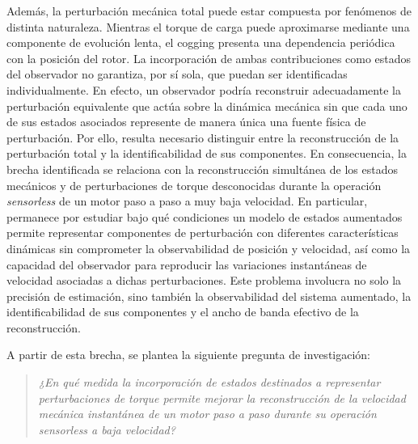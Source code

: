 Además, la perturbación mecánica total puede estar compuesta por fenómenos de distinta naturaleza. Mientras el torque de carga puede aproximarse mediante una componente de evolución lenta, el cogging presenta una dependencia periódica con la posición del rotor. La incorporación de ambas contribuciones como estados del observador no garantiza, por sí sola, que puedan ser identificadas individualmente. En efecto, un observador podría reconstruir adecuadamente la perturbación equivalente que actúa sobre la dinámica mecánica sin que cada uno de sus estados asociados represente de manera única una fuente física de perturbación. Por ello, resulta necesario distinguir entre la reconstrucción de la perturbación total y la identificabilidad de sus componentes.
%
%
%
%
%
En consecuencia, la brecha identificada se relaciona con la reconstrucción simultánea de los estados mecánicos y de perturbaciones de torque desconocidas durante la operación \textit{sensorless} de un motor paso a paso a muy baja velocidad. En particular, permanece por estudiar bajo qué condiciones un modelo de estados aumentados permite representar componentes de perturbación con diferentes características dinámicas sin comprometer la observabilidad de posición y velocidad, así como la capacidad del observador para reproducir las variaciones instantáneas de velocidad asociadas a dichas perturbaciones. Este problema involucra no solo la precisión de estimación, sino también la observabilidad del sistema aumentado, la identificabilidad de sus componentes y el ancho de banda efectivo de la reconstrucción.

%
%

A partir de esta brecha, se plantea la siguiente pregunta de investigación:

\begin{quote}
\textit{¿En qué medida la incorporación de estados destinados a representar 
perturbaciones de torque permite mejorar la reconstrucción de la velocidad 
mecánica instantánea de un motor paso a paso durante su operación 
\textit{sensorless} a baja velocidad?}
\end{quote}

